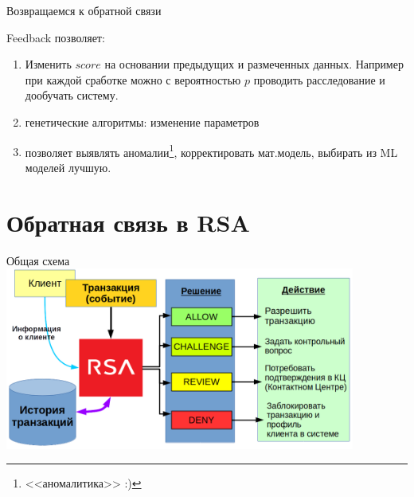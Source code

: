 \begin{frame}
	Возвращаемся к обратной связи
	\Large
	\begin{center}
	\end{center}
\end{frame}

\begin{frame}
	Feedback позволяет:
	\begin{enumerate}
		\item Изменить $score$ на основании предыдущих 
		и размеченных данных. Например при каждой сработке 
		можно с вероятностью $p$ проводить расследование и дообучать систему.
		\item генетические алгоритмы: изменение параметров
		\item позволяет выявлять аномалии\footnote{<<аномалитика>> :) },
		корректировать мат.модель, выбирать из ML моделей лучшую.
	\end{enumerate}
\end{frame}


\section{Обратная связь в RSA}\label{section:rsa_feedback}

\begin{frame}{Общая схема} 
	\includegraphics[width=11.5cm]{../pic/expert_system_rsa.png}
\end{frame}

